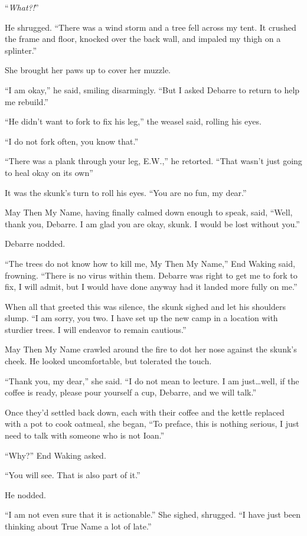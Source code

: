 ``\emph{What?!}''

He shrugged. ``There was a wind storm and a tree fell across my tent. It crushed the frame and floor, knocked over the back wall, and impaled my thigh on a splinter.''

She brought her paws up to cover her muzzle.

``I am okay,'' he said, smiling disarmingly. ``But I asked Debarre to return to help me rebuild.''

``He didn't want to fork to fix his leg,'' the weasel said, rolling his eyes.

``I do not fork often, you know that.''

``There was a plank through your leg, E.W.,'' he retorted. ``That wasn't just going to heal okay on its own''

It was the skunk's turn to roll his eyes. ``You are no fun, my dear.''

May Then My Name, having finally calmed down enough to speak, said, ``Well, thank you, Debarre. I am glad you are okay, skunk. I would be lost without you.''

Debarre nodded.

``The trees do not know how to kill me, My Then My Name,'' End Waking said, frowning. ``There is no virus within them. Debarre was right to get me to fork to fix, I will admit, but I would have done anyway had it landed more fully on me.''

When all that greeted this was silence, the skunk sighed and let his shoulders slump. ``I am sorry, you two. I have set up the new camp in a location with sturdier trees. I will endeavor to remain cautious.''

May Then My Name crawled around the fire to dot her nose against the skunk's cheek. He looked uncomfortable, but tolerated the touch.

``Thank you, my dear,'' she said. ``I do not mean to lecture. I am just\ldots well, if the coffee is ready, please pour yourself a cup, Debarre, and we will talk.''

Once they'd settled back down, each with their coffee and the kettle replaced with a pot to cook oatmeal, she began, ``To preface, this is nothing serious, I just need to talk with someone who is not Ioan.''

``Why?'' End Waking asked.

``You will see. That is also part of it.''

He nodded.

``I am not even sure that it is actionable.'' She sighed, shrugged. ``I have just been thinking about True Name a lot of late.''


